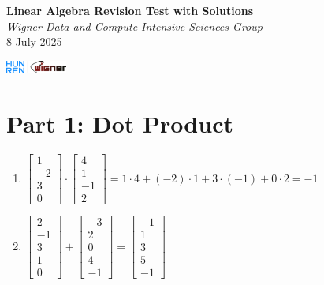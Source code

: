 \documentclass{article}
\begin{document}
\begin{minipage}{0.8\textwidth}
    \centering
    {\Large\textbf{Linear Algebra Revision Test with Solutions}\\ \textit{Wigner Data and Compute Intensive Sciences Group}}\\
	\vspace*{0.25cm}
	{\normalsize 8 July 2025}
\end{minipage}
\begin{minipage}{0.2\textwidth}
    \includegraphics[width=2cm]{../img/logo.png}
\end{minipage}

\section*{Part 1: Dot Product}
\begin{enumerate}
\item $\begin{bmatrix} 1 \\ -2 \\ 3 \\ 0 \end{bmatrix} \cdot \begin{bmatrix} 4 \\ 1 \\ -1 \\ 2 \end{bmatrix} = 1\cdot4 + (-2)\cdot1 + 3\cdot(-1) + 0\cdot2 = \boxed{-1}$

\item $\begin{bmatrix} 2 \\ -1 \\ 3 \\ 1 \\ 0 \end{bmatrix} + \begin{bmatrix} -3 \\ 2 \\ 0 \\ 4 \\ -1 \end{bmatrix} = \boxed{\begin{bmatrix} -1 \\ 1 \\ 3 \\ 5 \\ -1 \end{bmatrix}}$
\end{enumerate}
\end{document}
